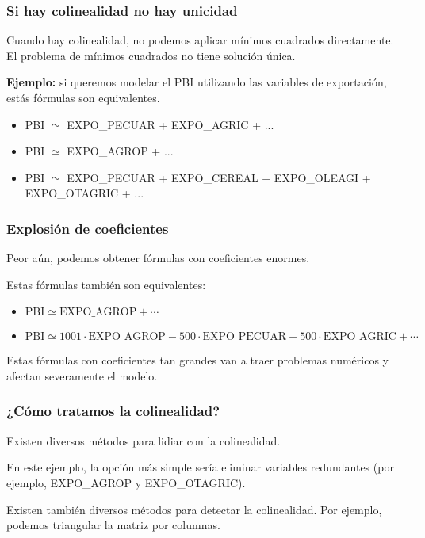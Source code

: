 \documentclass[aspectratio=169,12pt]{beamer}
\begin{document}

\begin{frame}
\frametitle{Si hay colinealidad no hay unicidad}

Cuando hay colinealidad, no podemos aplicar mínimos cuadrados directamente.
El problema de mínimos cuadrados no tiene solución única.

\textbf{Ejemplo:} si queremos modelar el PBI utilizando las variables de exportación, estás fórmulas son equivalentes.

{\footnotesize
\begin{itemize}
\item PBI $\simeq$ EXPO\_PECUAR + EXPO\_AGRIC + ...
\item PBI $\simeq$ EXPO\_AGROP + ... 
\item PBI $\simeq$ EXPO\_PECUAR + EXPO\_CEREAL + EXPO\_OLEAGI + EXPO\_OTAGRIC  + ...
\end{itemize}
}
\end{frame}

\begin{frame}
\frametitle{Explosión de coeficientes}

Peor aún, podemos obtener fórmulas con coeficientes enormes. 

Estas fórmulas también son equivalentes:
\begin{itemize}
\item $\text{PBI} \simeq \text{EXPO\_AGROP} + \cdots$
\item $\text{PBI} \simeq 1001 \cdot \text{EXPO\_AGROP} - 500 \cdot \text{EXPO\_PECUAR} - 500 \cdot \text{EXPO\_AGRIC} + \cdots$
\end{itemize}

Estas fórmulas con coeficientes tan grandes van a traer problemas numéricos  y afectan severamente el modelo.

\end{frame}

\begin{frame}
\frametitle{¿Cómo tratamos la colinealidad?}

Existen diversos métodos para lidiar con la colinealidad. 

En este ejemplo, la opción más simple sería eliminar variables redundantes (por ejemplo, EXPO\_AGROP y EXPO\_OTAGRIC).

Existen también diversos métodos para detectar la colinealidad. Por ejemplo, podemos triangular la matriz por columnas.

\end{frame}
\end{document}
